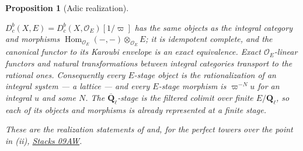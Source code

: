 \documentclass[11pt]{article}
\theoremstyle{plain}
\newtheorem{proposition}[theorem]{Proposition}
\theoremstyle{definition}
\newcommand{\stacks}[1]{\href{https://stacks.math.columbia.edu/tag/#1}{Stacks #1}}
\begin{document}
\begin{proposition}[Adic realization]
\begin{enumerate}
$D^b_c(X,E)=D^b_c(X,\mathcal O_E)[1/\varpi]$ has the same objects as the
integral category and morphisms
$\operatorname{Hom}_{\mathcal O_E}(-,-)\otimes_{\mathcal O_E}E$; it is
idempotent complete, and the canonical functor to its Karoubi envelope is an
exact equivalence.  Exact $\mathcal O_E$-linear functors and natural
transformations between integral categories transport to the rational ones.
Consequently every $E$-stage object is the rationalization of an integral
system --- a lattice --- and every $E$-stage morphism is $\varpi^{-N}u$ for
an integral $u$ and some $N$.  The $\overline{\mathbf Q}_\ell$-stage is the filtered colimit over
finite $E/\mathbf Q_\ell$, so each of its objects and morphisms is already represented
at a finite stage.
\end{enumerate}
These are the realization statements of
\cite[\S\S6.5, 6.8; for the rationalization step (iii), 6.8.14 with
6.8.12--6.8.13]{bs} and, for the perfect towers over the point in (ii),
\stacks{09AW}.
\end{proposition}
\end{document}
